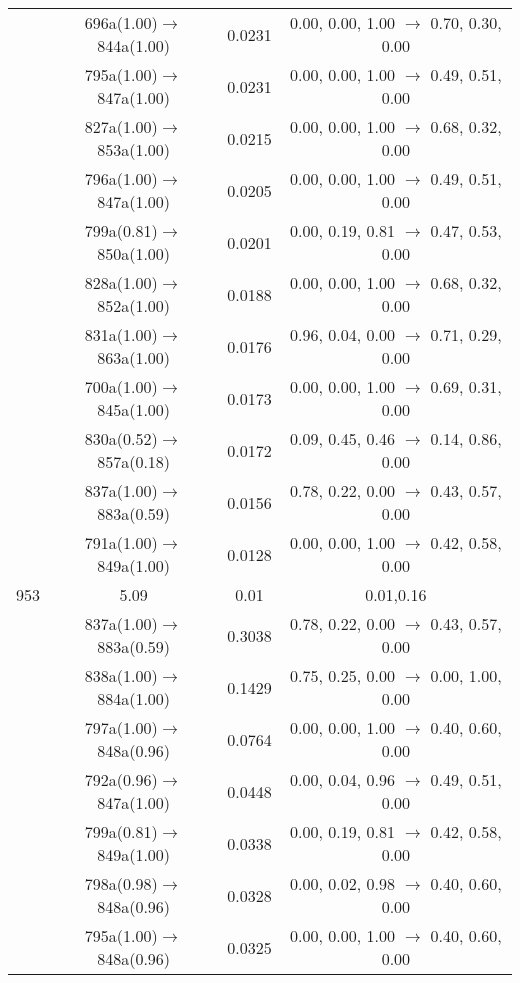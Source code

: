 \documentclass[10pt,a4paper]{article}
\begin{document}
\begin{longtable}{c|c|c|c}
 	& 696a(1.00)$\rightarrow$844a(1.00) &	 0.0231 &	 0.00, 0.00, 1.00 $\rightarrow$ 0.70, 0.30, 0.00 \\ 
 	& 795a(1.00)$\rightarrow$847a(1.00) &	 0.0231 &	 0.00, 0.00, 1.00 $\rightarrow$ 0.49, 0.51, 0.00 \\ 
 	& 827a(1.00)$\rightarrow$853a(1.00) &	 0.0215 &	 0.00, 0.00, 1.00 $\rightarrow$ 0.68, 0.32, 0.00 \\ 
 	& 796a(1.00)$\rightarrow$847a(1.00) &	 0.0205 &	 0.00, 0.00, 1.00 $\rightarrow$ 0.49, 0.51, 0.00 \\ 
 	& 799a(0.81)$\rightarrow$850a(1.00) &	 0.0201 &	 0.00, 0.19, 0.81 $\rightarrow$ 0.47, 0.53, 0.00 \\ 
 	& 828a(1.00)$\rightarrow$852a(1.00) &	 0.0188 &	 0.00, 0.00, 1.00 $\rightarrow$ 0.68, 0.32, 0.00 \\ 
 	& 831a(1.00)$\rightarrow$863a(1.00) &	 0.0176 &	 0.96, 0.04, 0.00 $\rightarrow$ 0.71, 0.29, 0.00 \\ 
 	& 700a(1.00)$\rightarrow$845a(1.00) &	 0.0173 &	 0.00, 0.00, 1.00 $\rightarrow$ 0.69, 0.31, 0.00 \\ 
 	& 830a(0.52)$\rightarrow$857a(0.18) &	 0.0172 &	 0.09, 0.45, 0.46 $\rightarrow$ 0.14, 0.86, 0.00 \\ 
 	& 837a(1.00)$\rightarrow$883a(0.59) &	 0.0156 &	 0.78, 0.22, 0.00 $\rightarrow$ 0.43, 0.57, 0.00 \\ 
 	& 791a(1.00)$\rightarrow$849a(1.00) &	 0.0128 &	 0.00, 0.00, 1.00 $\rightarrow$ 0.42, 0.58, 0.00 \\ 
 \hline953 &	 5.09 &	 0.01 &	 0.01,0.16 \\ 
  	& 837a(1.00)$\rightarrow$883a(0.59) &	 0.3038 &	 0.78, 0.22, 0.00 $\rightarrow$ 0.43, 0.57, 0.00 \\ 
 	& 838a(1.00)$\rightarrow$884a(1.00) &	 0.1429 &	 0.75, 0.25, 0.00 $\rightarrow$ 0.00, 1.00, 0.00 \\ 
 	& 797a(1.00)$\rightarrow$848a(0.96) &	 0.0764 &	 0.00, 0.00, 1.00 $\rightarrow$ 0.40, 0.60, 0.00 \\ 
 	& 792a(0.96)$\rightarrow$847a(1.00) &	 0.0448 &	 0.00, 0.04, 0.96 $\rightarrow$ 0.49, 0.51, 0.00 \\ 
 	& 799a(0.81)$\rightarrow$849a(1.00) &	 0.0338 &	 0.00, 0.19, 0.81 $\rightarrow$ 0.42, 0.58, 0.00 \\ 
 	& 798a(0.98)$\rightarrow$848a(0.96) &	 0.0328 &	 0.00, 0.02, 0.98 $\rightarrow$ 0.40, 0.60, 0.00 \\ 
 	& 795a(1.00)$\rightarrow$848a(0.96) &	 0.0325 &	 0.00, 0.00, 1.00 $\rightarrow$ 0.40, 0.60, 0.00 \\ 

\end{longtable}
\end{document}
